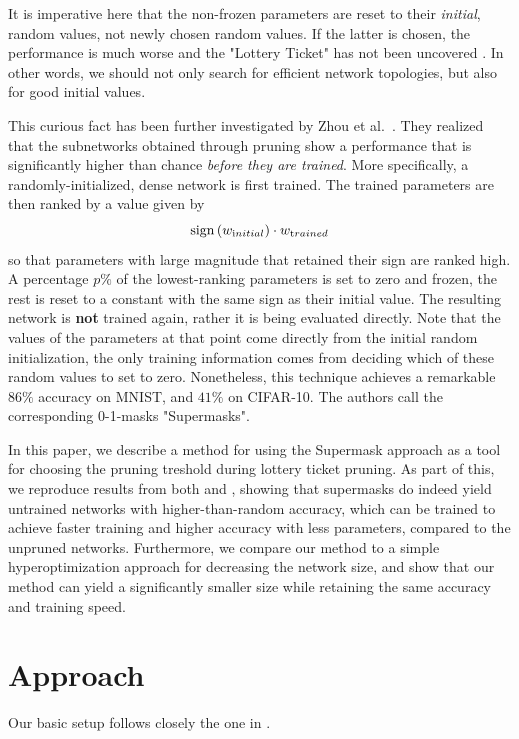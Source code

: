 \documentclass[12pt,final,twoside]{article}
\theoremstyle{plain}
\theoremstyle{definition}
\theoremstyle{remark}
\theoremstyle{named}
\begin{document}
It is imperative here that the non-frozen parameters are reset to their \textit{initial}, random values, not newly chosen random values. If the latter is chosen, the performance is much worse and the "Lottery Ticket" has not been uncovered \cite{lottery}. In other words, we should not only search for efficient network topologies, but also for good initial values.

This curious fact has been further investigated by Zhou et al.\ \cite{supermask}. They realized that the subnetworks obtained through pruning show a performance that is significantly higher than chance \textit{before they are trained}. More specifically, a randomly-initialized, dense network is first trained. The trained parameters are then ranked by a value given by
$$
\operatorname{sign}\left(w_{\text initial}\right) \cdot w_{\text trained}
$$
so that parameters with large magnitude that retained their sign are ranked high. A percentage $p\%$ of the lowest-ranking parameters is set to zero and frozen, the rest is reset to a constant with the same sign as their initial value. The resulting network is \textbf{not} trained again, rather it is being evaluated directly. Note that the values of the parameters at that point come directly from the initial random initialization, the only training information comes from deciding which of these random values to set to zero. Nonetheless, this technique achieves a remarkable $86\%$ accuracy on MNIST, and $41\%$ on CIFAR-10. The authors call the corresponding 0-1-masks "Supermasks".

In this paper, we describe a method for using the Supermask approach as a tool for choosing the pruning treshold during lottery ticket pruning. As part of this, we reproduce results from both \cite{lottery} and \cite{supermask}, showing that supermasks do indeed yield untrained networks with higher-than-random accuracy, which can be trained to achieve faster training and higher accuracy with less parameters, compared to the unpruned networks. Furthermore, we compare our method to  a simple hyperoptimization approach for decreasing the network size, and show that our method can yield a significantly smaller size while retaining the same accuracy and training speed.

\section{Approach}

Our basic setup follows closely the one in \cite{supermask}. 
\end{document}
